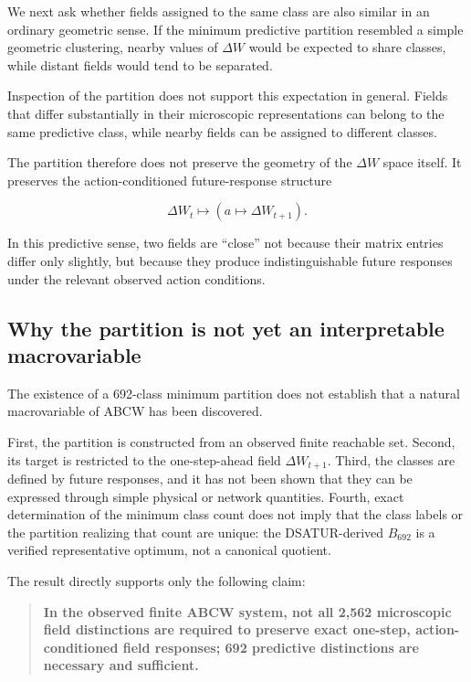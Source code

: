 \documentclass[
  11pt,
]{article}
\begin{document}
We next ask whether fields assigned to the same class are also similar
in an ordinary geometric sense. If the minimum predictive partition
resembled a simple geometric clustering, nearby values of \({\Delta W}\)
would be expected to share classes, while distant fields would tend to
be separated.

Inspection of the partition does not support this expectation in
general. Fields that differ substantially in their microscopic
representations can belong to the same predictive class, while nearby
fields can be assigned to different classes.

The partition therefore does not preserve the geometry of the
\({\Delta W}\) space itself. It preserves the action-conditioned
future-response structure

\[{\Delta W_t\longmapsto\left(a\longmapsto\Delta W_{t+1}\right).}\]

In this predictive sense, two fields are ``close'' not because their
matrix entries differ only slightly, but because they produce
indistinguishable future responses under the relevant observed action
conditions.

\hypertarget{why-the-partition-is-not-yet-an-interpretable-macrovariable}{%
\subsection{Why the partition is not yet an interpretable
macrovariable}\label{why-the-partition-is-not-yet-an-interpretable-macrovariable}}

The existence of a 692-class minimum partition does not establish that a
natural macrovariable of ABCW has been discovered.

First, the partition is constructed from an observed finite reachable
set. Second, its target is restricted to the one-step-ahead field
\({\Delta W_{t+1}}\). Third, the classes are defined by future
responses, and it has not been shown that they can be expressed through
simple physical or network quantities. Fourth, exact determination of
the minimum class count does not imply that the class labels or the
partition realizing that count are unique: the DSATUR-derived
\({B_{692}}\) is a verified representative optimum, not a canonical
quotient.

The result directly supports only the following claim:

\begin{quote}
\textbf{In the observed finite ABCW system, not all 2,562 microscopic
field distinctions are required to preserve exact one-step,
action-conditioned field responses; 692 predictive distinctions are
necessary and sufficient.}
\end{quote}
\end{document}
